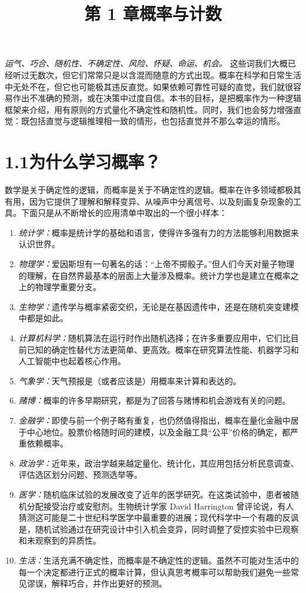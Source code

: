 \documentclass[UTF8, 12pt, fontset=fandol, oneside]{ctexart}
\title{第 1 章\quad 概率与计数}
\author{}
\date{}
\begin{document}
\maketitle

\noindent\textit{运气、巧合、随机性、不确定性、风险、怀疑、命运、机会。}
这些词我们大概已经听过无数次，但它们常常只是以含混而随意的方式出现。概率在科学和日常生活中无处不在，但它也可能极其违反直觉。如果依赖可靠性可疑的直觉，我们就很容易作出不准确的预测，或在决策中过度自信。本书的目标，是把概率作为一种逻辑框架来介绍，用有原则的方式量化不确定性和随机性。同时，我们也会努力增强直觉：既包括直觉与逻辑推理相一致的情形，也包括直觉并不那么幸运的情形。

\section*{1.1\quad 为什么学习概率？}

数学是关于确定性的逻辑，而概率是关于不确定性的逻辑。概率在许多领域都极其有用，因为它提供了理解和解释变异、从噪声中分离信号、以及刻画复杂现象的工具。下面只是从不断增长的应用清单中取出的一个很小样本：

\begin{enumerate}
  \item \textit{统计学：}概率是统计学的基础和语言，使得许多强有力的方法能够利用数据来认识世界。
  \item \textit{物理学：}爱因斯坦有一句著名的话：“上帝不掷骰子。”但人们今天对量子物理的理解，在自然界最基本的层面上大量涉及概率。统计力学也是建立在概率之上的物理学重要分支。
  \item \textit{生物学：}遗传学与概率紧密交织，无论是在基因遗传中，还是在随机突变建模中都是如此。
  \item \textit{计算机科学：}随机算法在运行时作出随机选择；在许多重要应用中，它们比目前已知的确定性替代方法更简单、更高效。概率在研究算法性能、机器学习和人工智能中也起着核心作用。
  \item \textit{气象学：}天气预报是（或者应该是）用概率来计算和表达的。
  \item \textit{赌博：}概率的许多早期研究，都是为了回答与赌博和机会游戏有关的问题。
  \item \textit{金融学：}即使与前一个例子略有重复，也仍然值得指出，概率在量化金融中居于中心地位。股票价格随时间的建模，以及金融工具“公平”价格的确定，都严重依赖概率。
  \item \textit{政治学：}近年来，政治学越来越定量化、统计化，其应用包括分析民意调查、评估选区划分问题、预测选举等。
  \item \textit{医学：}随机临床试验的发展改变了近年的医学研究。在这类试验中，患者被随机分配接受治疗或安慰剂。生物统计学家 David Harrington 曾评论说，有人猜测这可能是二十世纪科学医学中最重要的进展；现代科学中一个有趣的反讽是，随机试验通过在研究设计中引入机会变异，同时调整了受控实验中已观察和未观察到的异质性。
  \item \textit{生活：}生活充满不确定性，而概率是不确定性的逻辑。虽然不可能对生活中的每一个决定都进行正式的概率计算，但认真思考概率可以帮助我们避免一些常见谬误，解释巧合，并作出更好的预测。
\end{enumerate}
\end{document}
